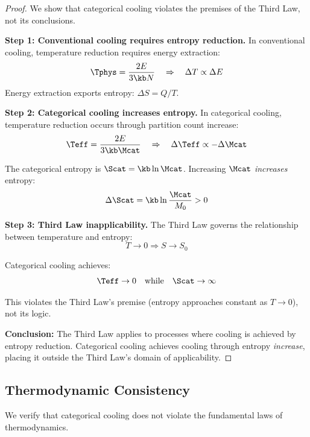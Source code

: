 \begin{proof}
We show that categorical cooling violates the premises of the Third Law, not its conclusions.

\textbf{Step 1: Conventional cooling requires entropy reduction.}
In conventional cooling, temperature reduction requires energy extraction:
\begin{equation}
\Tphys = \frac{2E}{3\kb N} \quad \Rightarrow \quad \Delta T \propto \Delta E
\end{equation}
Energy extraction exports entropy: $\Delta S = Q/T$.

\textbf{Step 2: Categorical cooling increases entropy.}
In categorical cooling, temperature reduction occurs through partition count increase:
\begin{equation}
\Teff = \frac{2E}{3\kb \Mcat} \quad \Rightarrow \quad \Delta \Teff \propto -\Delta \Mcat
\end{equation}

The categorical entropy is $\Scat = \kb \ln \Mcat$. Increasing $\Mcat$ \textit{increases} entropy:
\begin{equation}
\Delta \Scat = \kb \ln \frac{\Mcat}{M_0} > 0
\end{equation}

\textbf{Step 3: Third Law inapplicability.}
The Third Law governs the relationship between temperature and entropy:
\begin{equation}
T \to 0 \Rightarrow S \to S_0
\end{equation}

Categorical cooling achieves:
\begin{equation}
\Teff \to 0 \quad \text{while} \quad \Scat \to \infty
\end{equation}

This violates the Third Law's premise (entropy approaches constant as $T \to 0$), not its logic.

\textbf{Conclusion:} The Third Law applies to processes where cooling is achieved by entropy reduction. Categorical cooling achieves cooling through entropy \textit{increase}, placing it outside the Third Law's domain of applicability.
\end{proof}

\subsection{Thermodynamic Consistency}

We verify that categorical cooling does not violate the fundamental laws of thermodynamics.

